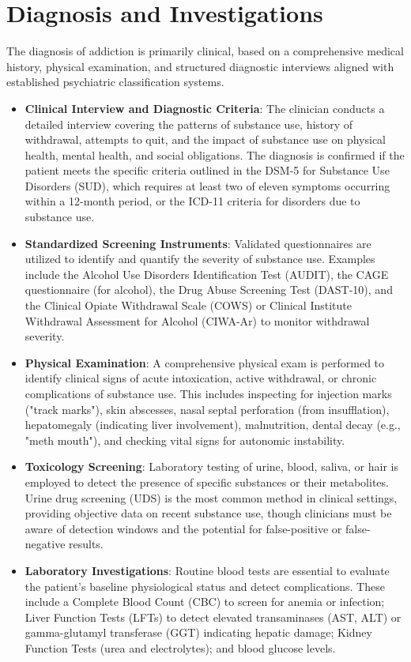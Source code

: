 \section*{Diagnosis and Investigations}
The diagnosis of addiction is primarily clinical, based on a comprehensive medical history, physical examination, and structured diagnostic interviews aligned with established psychiatric classification systems.
\begin{itemize}
    \item \textbf{Clinical Interview and Diagnostic Criteria}: The clinician conducts a detailed interview covering the patterns of substance use, history of withdrawal, attempts to quit, and the impact of substance use on physical health, mental health, and social obligations. The diagnosis is confirmed if the patient meets the specific criteria outlined in the DSM-5 for Substance Use Disorders (SUD), which requires at least two of eleven symptoms occurring within a 12-month period, or the ICD-11 criteria for disorders due to substance use.
    \item \textbf{Standardized Screening Instruments}: Validated questionnaires are utilized to identify and quantify the severity of substance use. Examples include the Alcohol Use Disorders Identification Test (AUDIT), the CAGE questionnaire (for alcohol), the Drug Abuse Screening Test (DAST-10), and the Clinical Opiate Withdrawal Scale (COWS) or Clinical Institute Withdrawal Assessment for Alcohol (CIWA-Ar) to monitor withdrawal severity.
    \item \textbf{Physical Examination}: A comprehensive physical exam is performed to identify clinical signs of acute intoxication, active withdrawal, or chronic complications of substance use. This includes inspecting for injection marks ("track marks"), skin abscesses, nasal septal perforation (from insufflation), hepatomegaly (indicating liver involvement), malnutrition, dental decay (e.g., "meth mouth"), and checking vital signs for autonomic instability.
    \item \textbf{Toxicology Screening}: Laboratory testing of urine, blood, saliva, or hair is employed to detect the presence of specific substances or their metabolites. Urine drug screening (UDS) is the most common method in clinical settings, providing objective data on recent substance use, though clinicians must be aware of detection windows and the potential for false-positive or false-negative results.
    \item \textbf{Laboratory Investigations}: Routine blood tests are essential to evaluate the patient's baseline physiological status and detect complications. These include a Complete Blood Count (CBC) to screen for anemia or infection; Liver Function Tests (LFTs) to detect elevated transaminases (AST, ALT) or gamma-glutamyl transferase (GGT) indicating hepatic damage; Kidney Function Tests (urea and electrolytes); and blood glucose levels.

\end{itemize}
